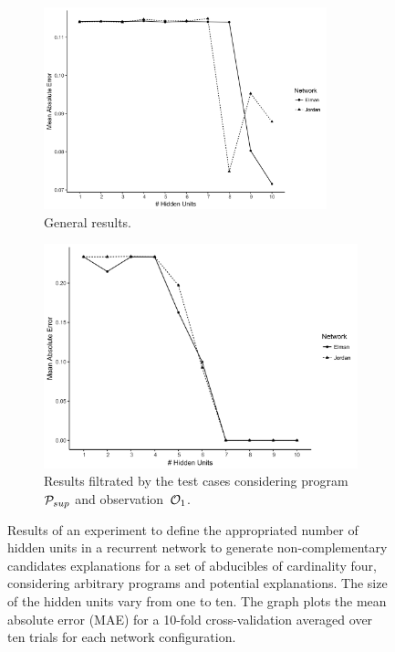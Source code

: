 \begin{figure}
	\centering
	\begin{subfigure}[b]{1.\textwidth}
	\includegraphics[width=0.9\textwidth]{figures/error_min_4}
	\caption{General results.}
	\label{fig:error_min_4}
	\end{subfigure}
	\bigskip
	\begin{subfigure}[b]{0.9\textwidth}
  	 \includegraphics[width=1.0\textwidth]{figures/l_error_min_4}
	 \caption{Results filtrated by the test cases considering program $\mathcal{P}_{sup}$ and observation~$\mathcal{O}_1$.}
	\label{fig:l_error_min_4}
	\end{subfigure}
	\caption{Results of an experiment to define the appropriated number of hidden units in a recurrent network to generate non-complementary candidates explanations for a set of abducibles of cardinality four, considering arbitrary programs and potential explanations. The size of the hidden units vary from one to ten. The graph plots the mean absolute error (MAE) for a 10-fold cross-validation averaged over ten trials for each network configuration.}
\end{figure}

